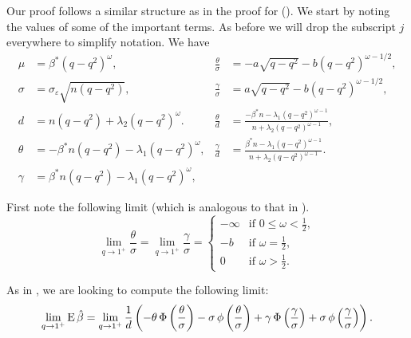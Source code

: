 Our proof follows a similar structure as in the proof for 
(). We start by noting the values of some of the
important terms. As before we will drop the subscript \(j\) everywhere to simplify
notation. We have
\begin{align*}
  \mu    & = \beta^*(q -q^2)^\omega,                     & \frac{\theta}{\sigma} & = -a\sqrt{q-q^2} - b(q-q^2)^{\omega - 1/2},                                           \\
  \sigma & = \sigma_\varepsilon \sqrt{n(q-q^2)},         & \frac{\gamma}{\sigma} & = a\sqrt{q-q^2} - b(q-q^2)^{\omega - 1/2},                                            \\
  d      & = n(q-q^2) + \lambda_2(q-q^2)^\omega.\,       & \frac{\theta}{d}      & = \frac{-\beta^*n - \lambda_1(q-q^2)^{\omega - 1}}{n + \lambda_2(q-q^2)^{\omega -1}}, \\
  \theta & = -\beta^*n(q-q^2) - \lambda_1(q-q^2)^\omega, & \frac{\gamma}{d}      & = \frac{\beta^*n - \lambda_1(q-q^2)^{\omega - 1}}{n + \lambda_2(q-q^2)^{\omega -1}}.  \\
  \gamma & = \beta^*n(q-q^2) - \lambda_1(q-q^2)^\omega,
\end{align*}

First note the following limit (which is analogous to that in ).
\begin{equation}
  \label{eq:eval-sigma-limits-weighted}
  \lim_{q \rightarrow 1^+} \frac{\theta}{\sigma} = \lim_{q \rightarrow 1^+} \frac{\gamma}{\sigma} =
  \begin{cases}
    -\infty & \text{if } 0 \leq \omega < \frac{1}{2}, \\
    -b      & \text{if } \omega = \frac{1}{2},        \\
    0       & \text{if } \omega > \frac{1}{2}.
  \end{cases}
\end{equation}

As in , we are looking to compute the following limit:
\begin{equation}
  \label{eq:eval-qlimit-weighted}
  \lim_{q \rightarrow 1^+} \operatorname{E} \hat{\beta} =\lim_{q \rightarrow 1^+}\frac{1}{d}\left(-\theta \operatorname{\Phi}\left(\frac{\theta}{\sigma}\right) - \sigma \operatorname{\phi}\left(\frac{\theta}{\sigma}\right) + \gamma \operatorname{\Phi}\left(\frac{\gamma}{\sigma}\right) + \sigma \operatorname{\phi}\left(\frac{\gamma}{\sigma}\right)\right).
\end{equation}

